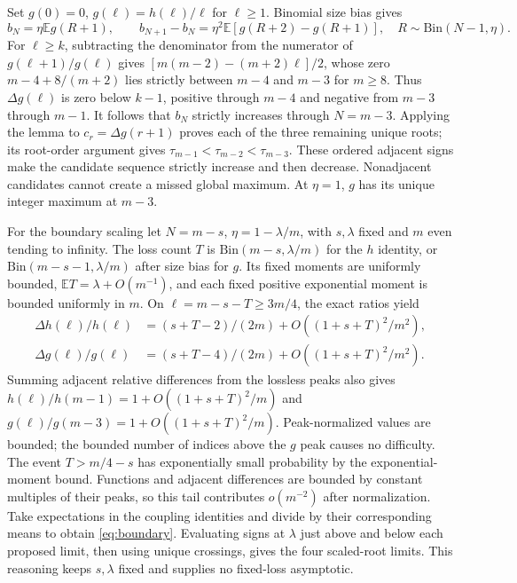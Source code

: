 \documentclass[11pt,a4paper]{article}
\theoremstyle{remark}\newtheorem{remark}[theorem]{Remark}
\newcommand{\E}{\mathbb E}
\begin{document}
Set $g(0)=0$, $g(\ell)=h(\ell)/\ell$ for $\ell\ge1$. Binomial size bias gives
\begin{equation}
 b_N=\eta\E g(R+1),\qquad b_{N+1}-b_N=\eta^2\E[g(R+2)-g(R+1)],\quad R\sim\mathrm{Bin}(N-1,\eta).
\end{equation}
For $\ell\ge k$, subtracting the denominator from the numerator of $g(\ell+1)/g(\ell)$ gives $[m(m-2)-(m+2)\ell]/2$, whose zero $m-4+8/(m+2)$ lies strictly between $m-4$ and $m-3$ for $m\ge8$. Thus $\Delta g(\ell)$ is zero below $k-1$, positive through $m-4$ and negative from $m-3$ through $m-1$. It follows that $b_N$ strictly increases through $N=m-3$. Applying the lemma to $c_r=\Delta g(r+1)$ proves each of the three remaining unique roots; its root-order argument gives $\tau_{m-1}<\tau_{m-2}<\tau_{m-3}$. These ordered adjacent signs make the candidate sequence strictly increase and then decrease. Nonadjacent candidates cannot create a missed global maximum. At $\eta=1$, $g$ has its unique integer maximum at $m-3$.

For the boundary scaling let $N=m-s$, $\eta=1-\lambda/m$, with $s,\lambda$ fixed and $m$ even tending to infinity. The loss count $T$ is $\mathrm{Bin}(m-s,\lambda/m)$ for the $h$ identity, or $\mathrm{Bin}(m-s-1,\lambda/m)$ after size bias for $g$. Its fixed moments are uniformly bounded, $\E T=\lambda+O(m^{-1})$, and each fixed positive exponential moment is bounded uniformly in $m$. On $\ell=m-s-T\ge3m/4$, the exact ratios yield
\begin{align}
 \Delta h(\ell)/h(\ell)&=(s+T-2)/(2m)+O((1+s+T)^2/m^2),\\
 \Delta g(\ell)/g(\ell)&=(s+T-4)/(2m)+O((1+s+T)^2/m^2).
\end{align}
Summing adjacent relative differences from the lossless peaks also gives $h(\ell)/h(m-1)=1+O((1+s+T)^2/m)$ and $g(\ell)/g(m-3)=1+O((1+s+T)^2/m)$. Peak-normalized values are bounded; the bounded number of indices above the $g$ peak causes no difficulty. The event $T>m/4-s$ has exponentially small probability by the exponential-moment bound. Functions and adjacent differences are bounded by constant multiples of their peaks, so this tail contributes $o(m^{-2})$ after normalization. Take expectations in the coupling identities and divide by their corresponding means to obtain \cref{eq:boundary}. Evaluating signs at $\lambda$ just above and below each proposed limit, then using unique crossings, gives the four scaled-root limits. This reasoning keeps $s,\lambda$ fixed and supplies no fixed-loss asymptotic.
\end{document}
